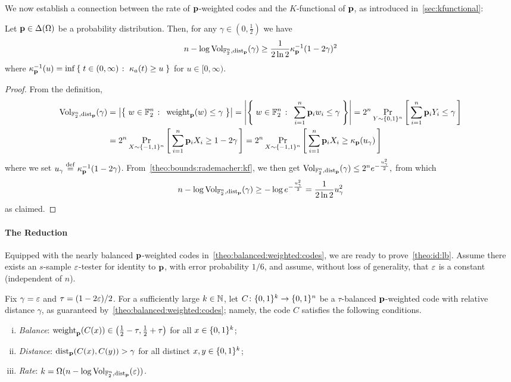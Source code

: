 We now establish a connection between the rate of $\p$-weighted codes and the $K$-functional of $\p$, as introduced in~\cref{sec:kfunctional}:

\begin{claim}\label{claim:connection:pweighted:kfunctional}
Let $\p\in\distribs{\domain}$ be a probability distribution. Then, for any $\gamma\in(0,\frac{1}{2})$ we have
\[
    n - \log \operatorname{Vol}_{\mathbb{F}_2^n,\pdistfunc[\p]}(\gamma) \geq \frac{1}{2\ln 2}\kf{\p}^{-1}(1-2\gamma)^2
\]
where $\kf{\p}^{-1}(u) = \inf\setOfSuchThat{ t\in(0,\infty) }{ \kf{a}(t) \geq u }$ for $u\in[0,\infty)$. 
\end{claim}
\begin{proof}
  From the definition,
  \begin{align*}
    \operatorname{Vol}_{\mathbb{F}_2^n,\pdistfunc[\p]}(\gamma)
        &= \abs{ \setOfSuchThat{w\in \mathbb{F}_2^n }{ \pweight[\p]{w} \leq \gamma } }
        = \abs{ \setOfSuchThat{w\in \mathbb{F}_2^n }{ \sum_{i=1}^n \p_i w_i \leq \gamma } }
        = 2^n \probaDistrOf{Y \sim \bitset^n }{ \sum_{i=1}^n \p_i Y_i \leq \gamma }  \\
        &= 2^n \probaDistrOf{X \sim \{-1,1\}^n }{ \sum_{i=1}^n \p_i X_i \geq 1-2\gamma } 
        = 2^n \probaDistrOf{X \sim \{-1,1\}^n }{ \sum_{i=1}^n \p_i X_i \geq \kf{\p}(u_\gamma) } 
  \end{align*}
  where we set $u_\gamma \eqdef \kf{\p}^{-1}(1-2\gamma)$. From~\cref{theo:bounds:rademacher:kf}, we then get
  $
    \operatorname{Vol}_{\mathbb{F}_2^n,\pdistfunc[\p]}(\gamma) \leq 2^n e^{-\frac{u_\gamma^2}{2}}, 
  $
  from which
  \[
      n-\log\operatorname{Vol}_{\mathbb{F}_2^n,\pdistfunc[\p]}(\gamma) \geq -\log e^{-\frac{u_\gamma^2}{2}} = \frac{1}{2\ln 2} u_\gamma^2
  \]
  as claimed.
\end{proof}

\paragraph{The Reduction}
Equipped with the nearly balanced $\p$-weighted codes in~\cref{theo:balanced:weighted:codes}, we are ready to prove~\cref{theo:id:lb}. Assume there exists an $s$-sample $\eps$-tester for identity to $\p$, with error probability $1/6$, and assume, without loss of generality, that $\eps$ is a constant (independent of $n$).

Fix $\gamma = \eps$ and $\tau =(1 - 2\eps)/2$. For a sufficiently large $k\in\N$, let $C\colon \bitset^k \to \bitset^n$ be a $\tau$-balanced $\p$-weighted code with relative distance $\gamma$, as guaranteed by~\cref{theo:balanced:weighted:codes}; namely, the code $C$ satisfies the following conditions.
\begin{enumerate}[(i)]
  \item \emph{Balance}: $\pweight[\p]{C(x)}\in\left(\frac{1}{2} -\tau, \frac{1}{2}+\tau\right)$ for all $x\in \bitset^k$;
  \item \emph{Distance}: $\pdist[\p]{C(x)}{C(y)} > \gamma$ for all distinct $x,y\in \bitset^k$;
  \item \emph{Rate}: $k = \Omega(n - \log \operatorname{Vol}_{\mathbb{F}_2^n,\pdistfunc[\p]}(\eps))$.
\end{enumerate}

